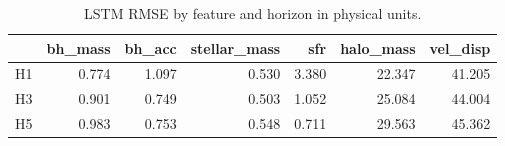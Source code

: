 \begin{table}
\caption{LSTM RMSE by feature and horizon in physical units.}
\label{tab:rmse_feature_phys}
\begin{tabular}{lrrrrrr}
\toprule
 & bh\_mass & bh\_acc & stellar\_mass & sfr & halo\_mass & vel\_disp \\
\midrule
H1 & 0.774 & 1.097 & 0.530 & 3.380 & 22.347 & 41.205 \\
H3 & 0.901 & 0.749 & 0.503 & 1.052 & 25.084 & 44.004 \\
H5 & 0.983 & 0.753 & 0.548 & 0.711 & 29.563 & 45.362 \\
\bottomrule
\end{tabular}
\end{table}
